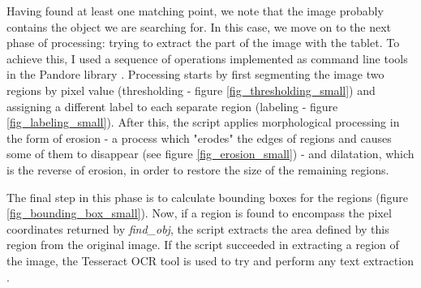 \documentclass [12pt,a4paper]{report}
\begin{document}
Having found at least one matching point, we note that the image probably contains the object we are searching for. In this case, we move on to the next phase of processing: trying to extract the part of the image with the tablet.
To achieve this, I used a sequence of operations implemented as command line tools in the Pandore library \cite{pandore}. Processing starts by first segmenting the image two regions by pixel value (thresholding - figure \ref{fig_thresholding_small}) and assigning a different label to each separate region (labeling - figure \ref{fig_labeling_small}). After this, the script applies morphological processing in the form of erosion - a process which "erodes" the edges of regions and causes some of them to disappear (see figure \ref{fig_erosion_small}) - and dilatation, which is the reverse of erosion, in order to restore the size of the remaining regions. 

The final step in this phase is to calculate bounding boxes for the regions (figure \ref{fig_bounding_box_small}). Now, if a region is found to encompass the pixel coordinates returned by \textit{find\_obj}, the script extracts the area defined by this region from the original image.
If the script succeeded in extracting a region of the image, the Tesseract OCR tool is used to try and perform any text extraction \cite{tesseract}. 
\end{document}
